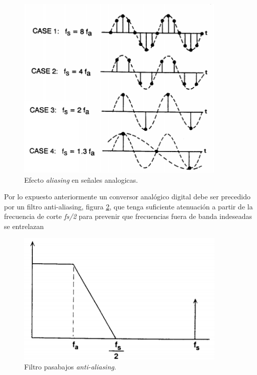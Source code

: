 \begin{figure}[ht]
	\centering
	\includegraphics[width=100mm]{./Figures/muestreo2.png}
	\caption{Efecto \textit{aliasing} en señales analogicas.}
	\label{fig:muestreo2}
\end{figure}

Por lo expuesto anteriormente un conversor analógico digital debe ser precedido por un filtro anti-aliasing, figura \ref{fig:muestreo3}, que tenga suficiente atenuación a partir de la frecuencia de corte \textit{fs/2} para prevenir que frecuencias fuera de banda indeseadas se entrelazan

\begin{figure}[ht]
	\centering
	\includegraphics[width=100mm]{./Figures/muestreo3.png}
	\caption{Filtro pasabajos \textit{anti-aliasing}.}
	\label{fig:muestreo3}
\end{figure}

